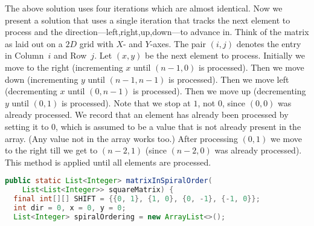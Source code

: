\documentclass[10pt,openany,twoside,letterpaper,extrafontsizes]{memoir}
\newif\ifCpp
\newif\ifJava
\newcommand{\myindex}[1]{%
\index[terms]{#1}%
}
\begin{document}
\begin{Spacing}{\arraysSpacing}
The above solution uses four iterations which are almost identical.
Now we present a solution that uses a single
iteration that tracks the next element to process
and the direction---left,right,up,down---to advance in.
Think of the matrix as laid out on a $2D$ grid with
$X$- and $Y$-axes.  The pair $(i,j)$ denotes the entry in Column~$i$ and Row~$j$.
Let $(x,y)$ be the next element to process.
Initially we move to the right (incrementing $x$ until $(n-1,0)$ is processed).
Then we move down (incrementing $y$ until $(n-1,n-1)$ is processed).
Then we move left (decrementing $x$ until $(0,n-1)$ is processed).
Then we move up (decrementing $y$ until $(0,1)$ is processed).
Note that we stop at $1$, not $0$, since $(0,0)$ was already processed.
We record that an element has already been processed by setting it to $0$, which is
assumed to be a value that is not already present in the array. (Any value not in the
array works too.)
After processing $(0,1)$ we move to the right till we get to $(n-2,1)$ (since $(n-2,0)$ was
already processed). This method is applied until all elements are processed.
\ifCpp
\begin{lstlisting}[language={[11]C++}]
vector<int> MatrixInSpiralOrder(vector<vector<int>> square_matrix) {
  const array<array<int, 2>, 4> kShift = {{{0, 1}, {1, 0}, {0, -1}, {-1, 0}}};
  int dir = 0, x = 0, y = 0;
  vector<int> spiral_ordering;

  for (int i = 0; i < square_matrix.size() * square_matrix.size(); ++i) {
    spiral_ordering.emplace_back(square_matrix[x][y]);
    square_matrix[x][y] = 0;
    int next_x = x + kShift[dir][0], next_y = y + kShift[dir][1];
    if (next_x < 0 || next_x >= square_matrix.size() || next_y < 0 ||
        next_y >= square_matrix.size() ||
        square_matrix[next_x][next_y] == 0) {
      dir = (dir + 1) % 4;
      next_x = x + kShift[dir][0], next_y = y + kShift[dir][1];
    }
    x = next_x, y = next_y;
  }
  return spiral_ordering;
}
\end{lstlisting}
\fi%
\ifJava
\begin{lstlisting}[language=Java]
public static List<Integer> matrixInSpiralOrder(
    List<List<Integer>> squareMatrix) {
  final int[][] SHIFT = {{0, 1}, {1, 0}, {0, -1}, {-1, 0}};
  int dir = 0, x = 0, y = 0;
  List<Integer> spiralOrdering = new ArrayList<>();


\end{lstlisting}
\end{Spacing}
\end{document}
